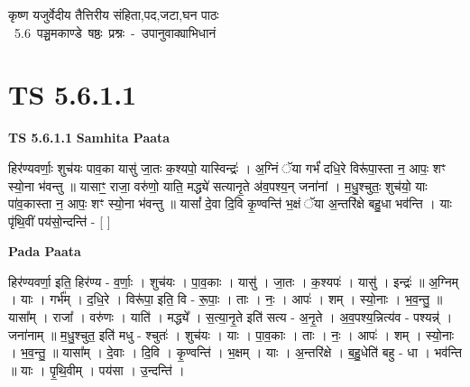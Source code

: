 \documentclass[17pt]{extarticle}
\begin{document}
\begin{titlepage}
    \begin{center}
 
\begin{sanskrit}
    { \Huge
    कृष्ण यजुर्वेदीय तैत्तिरीय संहिता,पद,जटा,घन पाठः 
    }
    \\
    \vspace{2.5cm}
    \mbox{ \Huge
    5.6      पञ्चमकाण्डे षष्ठः प्रश्नः - उपानुवाक्याभिधानं   }
\end{sanskrit}
\end{center}

\end{titlepage}
\tableofcontents
\pagebreak

\section*{ TS 5.6.1.1 }

\textbf{TS 5.6.1.1 } \newline
\textbf{Samhita Paata} \newline

हिर॑ण्यवर्णाः॒ शुच॑यः पाव॒का यासु॑ जा॒तः क॒श्यपो॒ यास्विन्द्रः॑ । अ॒ग्निं ॅया गर्भं॑ दधि॒रे विरू॑पा॒स्ता न॒ आपः॒ शꣳ स्यो॒ना भ॑वन्तु ॥ यासाꣳ॒॒ राजा॒ वरु॑णो॒ याति॒ मद्ध्ये॑ सत्यानृ॒ते अ॑व॒पश्य॒न् जना॑नां । म॒धु॒श्चुतः॒ शुच॑यो॒ याः पा॑व॒कास्ता न॒ आपः॒ शꣳ स्यो॒ना भ॑वन्तु ॥ यासां᳚ दे॒वा दि॒वि कृ॒ण्वन्ति॑ भ॒क्षं ॅया अ॒न्तरि॑क्षे बहु॒धा भव॑न्ति । याः पृ॑थि॒वीं पय॑सो॒न्दन्ति॑ - [  ] \newline

\textbf{Pada Paata} \newline

हिर॑ण्यवर्णा॒ इति॒ हिर॑ण्य - व॒र्णाः॒ । शुच॑यः । पा॒व॒काः । यासु॑ । जा॒तः । क॒श्यपः॑ । यासु॑ । इन्द्रः॑ ॥ अ॒ग्निम् । याः । गर्भ᳚म् । द॒धि॒रे । विरू॑पा॒ इति॒ वि - रू॒पाः॒ । ताः । नः॒ । आपः॑ । शम् । स्यो॒नाः । भ॒व॒न्तु॒ ॥ यासा᳚म् । राजा᳚ । वरु॑णः । याति॑ । मद्ध्ये᳚ । स॒त्या॒नृ॒ते इति॑ सत्य - अ॒नृ॒ते । अ॒व॒पश्य॒न्नित्य॑व - पश्यन्न्॑ । जना॑नाम् ॥ म॒धु॒श्चुत॒ इति॑ मधु - श्चुतः॑ । शुच॑यः । याः । पा॒व॒काः । ताः । नः॒ । आपः॑ । शम् । स्यो॒नाः । भ॒व॒न्तु॒ ॥ यासा᳚म् । दे॒वाः । दि॒वि । कृ॒ण्वन्ति॑ । भ॒क्षम् । याः । अ॒न्तरि॑क्षे । ब॒हु॒धेति॑ बहु - धा । भव॑न्ति ॥ याः । पृ॒थि॒वीम् । पय॑सा । उ॒न्दन्ति॑ ।  \newline




\end{document}
